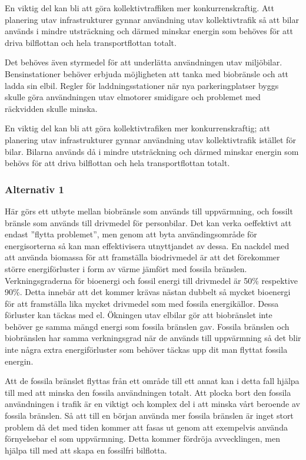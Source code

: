 \documentclass[a4paper,11pt,fleqn, titlepage]{article}
\begin{document}
En viktig del kan bli att göra kollektivtraffiken mer konkurrenskraftig. Att planering utav infrastrukturer gynnar användning utav kollektivtrafik så att bilar används i mindre utsträckning och därmed minskar energin som behöves för att driva bilflottan och hela transportflottan totalt.

Det behöves även styrmedel för att underlätta användningen utav miljöbilar. Bensinstationer behöver erbjuda möjligheten att tanka med biobränsle och att ladda sin elbil. Regler för laddningsstationer när nya parkeringplatser byggs skulle göra användningen utav elmotorer smidigare och problemet med räckvidden skulle minska.

En viktig del kan bli att göra kollektivtrafiken mer konkurrenskraftig; att planering utav infrastrukturer gynnar användning utav kollektivtrafik istället för bilar. Bilarna används då i mindre utsträckning och därmed minskar energin som behövs för att driva bilflottan och hela transportflottan totalt.

\subsubsection{Alternativ 1}
Här görs ett utbyte mellan biobränsle som används till uppvärmning, och
fossilt bränsle som används till drivmedel för personbilar. Det kan verka
oeffektivt att endast ''flytta problemet'', men genom att byta
användingsområde för energisorterna så kan man effektivisera utnyttjandet
av dessa. En nackdel med att använda biomassa för att framställa
biodrivmedel är att det förekommer större energiförluster i form av värme
jämfört med fossila bränslen. Verkningsgraderna för bioenergi och fossil
energi till drivmedel är 50\% respektive 90\%. Detta innebär att det kommer
krävas nästan dubbelt så mycket bioenergi för att framställa lika mycket
drivmedel som med fossila energikällor. Dessa förluster kan täckas med el.
Ökningen utav elbilar gör att biobränslet inte behöver ge samma mängd
energi som fossila bränslen gav. Fossila bränslen och biobränslen har samma
verkningsgrad när de används till uppvärmning så det blir inte några extra
energiförluster som behöver täckas upp dit man flyttat fossila energin.

Att de fossila bränslet flyttas från ett område till ett annat kan i detta fall hjälpa till med att minska den fossila användningen totalt. Att plocka bort den fossila användningen i trafik är en viktigt och komplex del i att minska vårt beroende av fossila bränslen. Så att till en början använda mer fossila bränslen är inget stort problem då det med tiden kommer att fasas ut genom att exempelvis använda förnyelsebar el som uppvärmning. Detta kommer fördröja avvecklingen, men hjälpa till med att skapa en fossilfri bilflotta.
\end{document}
